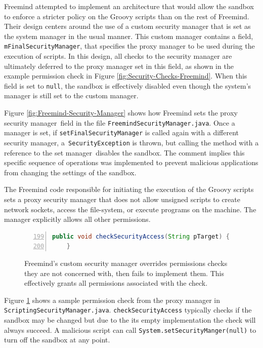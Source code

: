 \documentclass{sig-alternate}
\begin{document}
Freemind attempted to implement an architecture that would allow the
sandbox to enforce a stricter policy on the Groovy scripts than on
the rest of Freemind. Their design centers around the use of a custom
security manager that is set as the system manager in the usual manner.
This custom manager contains a field, \texttt{mFinalSecurityManager},
that specifies the proxy manager to be used during the execution of
scripts. In this design, all checks to the security manager are ultimately
deferred to the proxy manager set in this field, as shown in the example
permission check in Figure \ref{fig:Security-Checks-Freemind}. When
this field is set to \texttt{null}, the sandbox is effectively disabled
even though the system's manager is still set to the custom manager.

Figure \ref{fig:Freemind-Security-Manager} shows how Freemind sets
the proxy security manager\texttt{ }field in the file \texttt{FreemindSecurityManager.java}.
Once a manager is set, if \texttt{setFinalSecurityManager} is called
again with a different security manager, a\texttt{ SecurityException}
is thrown, but calling the method with a reference to the set manager\texttt{
}disables the sandbox. The comment implies this specific sequence
of operations was implemented to prevent malicious applications from
changing the settings of the sandbox.

The Freemind code responsible for initiating the execution of the
Groovy scripts sets a proxy security manager that does not allow unsigned
scripts to create network sockets, access the file-system, or execute
programs on the machine. The manager explicitly allows all other permissions.
\begin{figure}
\begin{lstlisting}[language=Java,numbers=left,basicstyle={\scriptsize},firstnumber=199,xrightmargin={0.1cm},numbersep={-10pt}]
	public void checkSecurityAccess(String pTarget) { 	
    }
\end{lstlisting}


\caption{Freemind's custom security manager overrides permissions checks they
are not concerned with, then fails to implement them. This effectively
grants all permissions associated with the check.}
\label{fig:Permission-Check-Groovy-Freemind}
\end{figure}
Figure \ref{fig:Permission-Check-Groovy-Freemind} shows a sample
permission check from the proxy manager in \texttt{ScriptingSecurityManager.java}.
\texttt{checkSecurityAccess} typically checks if the sandbox may be
changed but due to the its empty implementation the check will always
succeed. A malicious script can call \texttt{System.setSecurityManger(null)}
to turn off the sandbox at any point.
\end{document}

